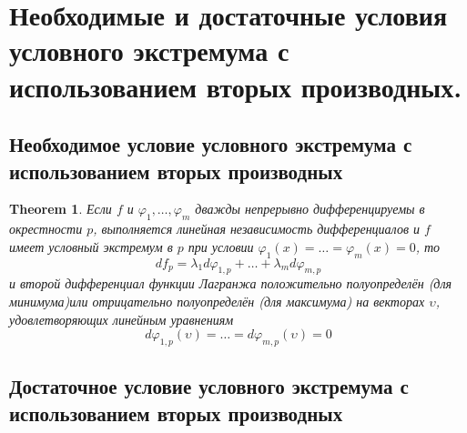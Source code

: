 \documentclass[a4paper,12pt]{article} %
\newtheorem{theorem}{Theorem}
\theoremstyle{definition}
\begin{document}
\section{Необходимые и достаточные условия условного экстремума с использованием вторых производных.}
\subsection{Необходимое условие условного экстремума с использованием вторых производных}
\begin{theorem}
	Если $f$ и $\varphi_1,\dots,\varphi_m$ дважды непрерывно дифференцируемы в окрестности $p$, выполняется линейная независимость дифференциалов и $f$ имеет условный экстремум в $p$ при условии $\varphi_1(x) = \dots = \varphi_m(x) = 0$, то
	$$d f_p = \lambda_1 d \varphi_{1, p} + \dots + \lambda_m d \varphi_{m, p}$$
	и второй дифференциал функции Лагранжа положительно полуопределён (для минимума)или отрицательно полуопределён (для максимума) на векторах $\upsilon$, удовлетворяющих линейным уравнениям
	$$d \varphi_{1, p}(\upsilon) = \dots = d \varphi_{m, p}(\upsilon) = 0$$
\end{theorem}
\subsection{Достаточное условие условного экстремума с использованием вторых производных}
\end{document}
